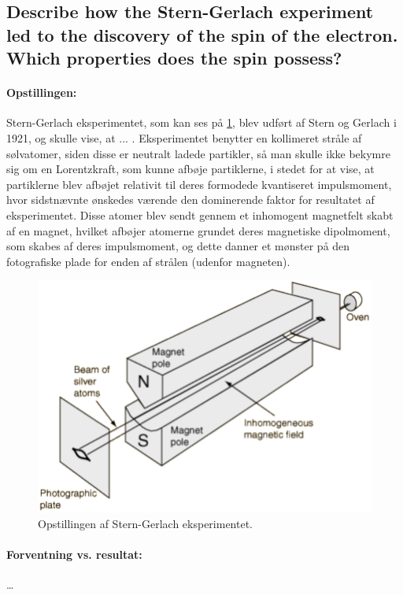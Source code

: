\subsection{Describe how the Stern-Gerlach experiment led to the discovery of the spin of the electron. Which properties does the spin possess?}


\paragraph{Opstillingen:} Stern-Gerlach eksperimentet, som kan ses på \cref{fig:Q08_SternGerlachEksperimentOpstilling}, blev udført af Stern og Gerlach i 1921, og skulle vise, at ... . Eksperimentet benytter en kollimeret stråle af sølvatomer, siden disse er neutralt ladede partikler, så man skulle ikke bekymre sig om en Lorentzkraft, som kunne afbøje partiklerne, i stedet for at vise, at partiklerne blev afbøjet relativit til deres formodede kvantiseret impulsmoment, hvor sidstnævnte ønskedes værende den dominerende faktor for resultatet af eksperimentet. Disse atomer blev sendt gennem et inhomogent magnetfelt skabt af en magnet, hvilket afbøjer atomerne grundet deres magnetiske dipolmoment, som skabes af deres impulsmoment, og dette danner et mønster på den fotografiske plade for enden af strålen (udenfor magneten).

\begin{figure}[!h]
    \centering
    \includegraphics[width = .75\textwidth]{Q08/images/SternGerlachExperiment.PNG}
    \caption{Opstillingen af Stern-Gerlach eksperimentet.}
    \label{fig:Q08_SternGerlachEksperimentOpstilling}
\end{figure}

\paragraph{Forventning vs. resultat:} \ldots

